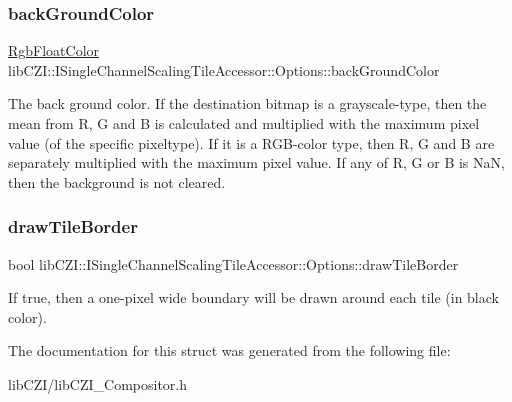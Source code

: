\subsubsection{\texorpdfstring{back\+Ground\+Color}{backGroundColor}}
{\footnotesize\ttfamily \hyperlink{structlib_c_z_i_1_1_rgb_float_color}{Rgb\+Float\+Color} lib\+C\+Z\+I\+::\+I\+Single\+Channel\+Scaling\+Tile\+Accessor\+::\+Options\+::back\+Ground\+Color}

The back ground color. If the destination bitmap is a grayscale-\/type, then the mean from R, G and B is calculated and multiplied with the maximum pixel value (of the specific pixeltype). If it is a R\+G\+B-\/color type, then R, G and B are separately multiplied with the maximum pixel value. If any of R, G or B is NaN, then the background is not cleared. \mbox{\label{structlib_c_z_i_1_1_i_single_channel_scaling_tile_accessor_1_1_options_ad0ff6bfe4369dd315edc4cfca9747596}} 
\subsubsection{\texorpdfstring{draw\+Tile\+Border}{drawTileBorder}}
{\footnotesize\ttfamily bool lib\+C\+Z\+I\+::\+I\+Single\+Channel\+Scaling\+Tile\+Accessor\+::\+Options\+::draw\+Tile\+Border}

If true, then a one-\/pixel wide boundary will be drawn around each tile (in black color). 

The documentation for this struct was generated from the following file\+:\begin{DoxyCompactItemize}
\item 
lib\+C\+Z\+I/lib\+C\+Z\+I\+\_\+\+Compositor.\+h\end{DoxyCompactItemize}
